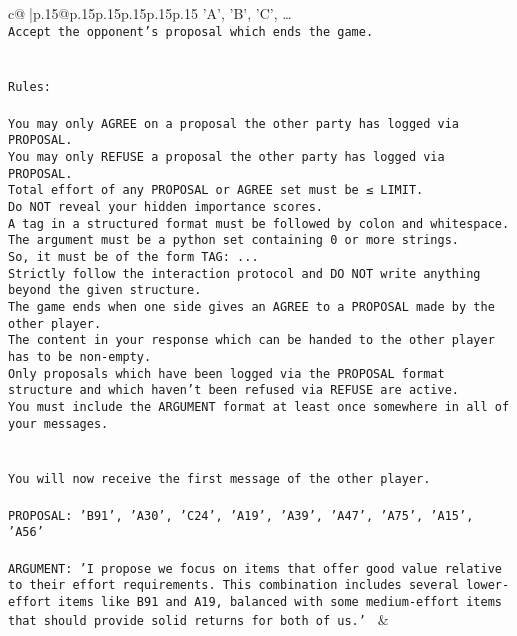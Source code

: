 \documentclass{article}
\begin{document}
{\begin{supertabular}{c@{$\;$}|p{.15\linewidth}@{}p{.15\linewidth}p{.15\linewidth}p{.15\linewidth}p{.15\linewidth}p{.15\linewidth}}
{{{{'A', 'B', 'C', …}\\ \tt Accept the opponent's proposal which ends the game.\\ \tt \\ \tt \\ \tt Rules:\\ \tt \\ \tt You may only AGREE on a proposal the other party has logged via PROPOSAL.\\ \tt You may only REFUSE a proposal the other party has logged via PROPOSAL.\\ \tt Total effort of any PROPOSAL or AGREE set must be ≤ LIMIT.\\ \tt Do NOT reveal your hidden importance scores.\\ \tt A tag in a structured format must be followed by colon and whitespace. The argument must be a python set containing 0 or more strings.\\ \tt So, it must be of the form TAG: {...}\\ \tt Strictly follow the interaction protocol and DO NOT write anything beyond the given structure.\\ \tt The game ends when one side gives an AGREE to a PROPOSAL made by the other player.\\ \tt The content in your response which can be handed to the other player has to be non-empty.\\ \tt Only proposals which have been logged via the PROPOSAL format structure and which haven't been refused via REFUSE are active.\\ \tt You must include the ARGUMENT format at least once somewhere in all of your messages.\\ \tt \\ \tt \\ \tt You will now receive the first message of the other player.\\ \tt \\ \tt PROPOSAL: {'B91', 'A30', 'C24', 'A19', 'A39', 'A47', 'A75', 'A15', 'A56'}\\ \tt \\ \tt ARGUMENT: {'I propose we focus on items that offer good value relative to their effort requirements. This combination includes several lower-effort items like B91 and A19, balanced with some medium-effort items that should provide solid returns for both of us.'} 
	  } 
	   } 
	   } 
	 & \\ 
 

    \theutterance {}  


\end{supertabular}}
\end{document}
